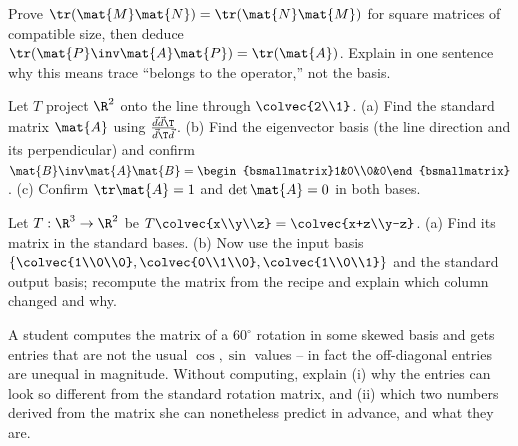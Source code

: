 \begin{exercise}
\label{ch31:ex-trace}
Prove $\tr(\mat{M}\mat{N})=\tr(\mat{N}\mat{M})$ for square matrices of compatible
size, then deduce $\tr(\mat{P}\inv\mat{A}\mat{P})=\tr(\mat{A})$. Explain in one
sentence why this means trace ``belongs to the operator,'' not the basis.
\end{exercise}

\begin{exercise}
\label{ch31:ex-proj-three}
Let $T$ project $\R^2$ onto the line through $\colvec{2\\1}$. (a) Find the standard
matrix $\mat{A}$ using $\frac{\vec{d}\vec{d}\T}{\vec{d}\T\vec{d}}$. (b) Find the
eigenvector basis (the line direction and its perpendicular) and confirm
$\mat{B}\inv\mat{A}\mat{B}=\begin{bsmallmatrix}1&0\\0&0\end{bsmallmatrix}$.
(c) Confirm $\tr\mat{A}=1$ and $\det\mat{A}=0$ in both bases.
\end{exercise}

\begin{exercise}
\label{ch31:ex-rect}
Let $T:\R^3\to\R^2$ be $T\colvec{x\\y\\z}=\colvec{x+z\\y-z}$. (a) Find its matrix
in the standard bases. (b) Now use the input basis
$\{\colvec{1\\0\\0},\colvec{0\\1\\0},\colvec{1\\0\\1}\}$ and the standard output
basis; recompute the matrix from the recipe and explain which column changed and
why.
\end{exercise}

\begin{exercise}
\label{ch31:ex-conceptual}
A student computes the matrix of a $60^\circ$ rotation in some skewed basis and
gets entries that are not the usual $\cos,\sin$ values -- in fact the off-diagonal
entries are unequal in magnitude. Without computing, explain (i) why the entries
can look so different from the standard rotation matrix, and (ii) which two numbers
derived from the matrix she can nonetheless predict in advance, and what they are.
\end{exercise}
